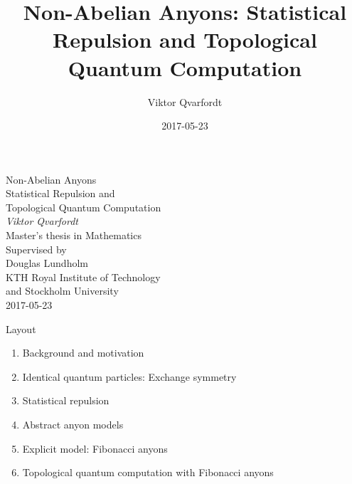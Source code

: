 \documentclass{beamer}
\title{Non-Abelian Anyons: Statistical Repulsion and Topological Quantum Computation}
\author{Viktor Qvarfordt}
\institute{KTH Royal Institute of Technology and Stockholm University}
\date{2017-05-23}
\begin{document}
 
\begin{frame}
  \centering
  \huge
  Non-Abelian Anyons \\[0.5em]
  \Large
  Statistical Repulsion and \\
  Topological Quantum Computation \\[1.5em]
  \normalsize
  \textit{Viktor Qvarfordt} \\[1.5em]
  Master's thesis in Mathematics \\[1em]
  \small
  Supervised by \\
  Douglas Lundholm \\[1em]
  KTH Royal Institute of Technology \\
  and Stockholm University \\[1em]
  2017-05-23
\end{frame}






\begin{frame}{Layout}
  \begin{enumerate}
    \pause
    \item Background and motivation
    \pause
    \item Identical quantum particles: Exchange symmetry
    \pause
    \item Statistical repulsion
    \pause
    \item Abstract anyon models
    \pause
    \item Explicit model: Fibonacci anyons
    \pause
    \item Topological quantum computation with Fibonacci anyons
  \end{enumerate}
\end{frame}
\end{document}
